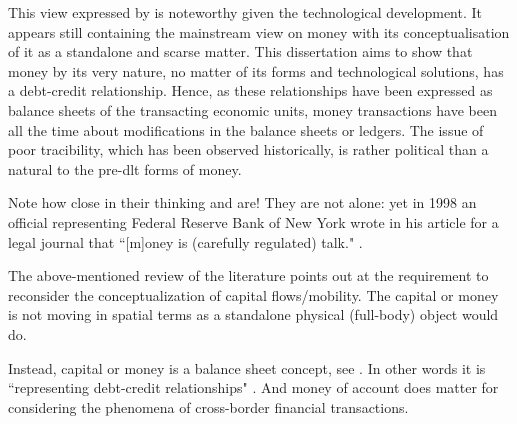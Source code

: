 This view expressed by \citeauthor{westermeier2023} is noteworthy given the technological development. It appears still containing the mainstream view on money with its conceptualisation of it as a standalone and scarse matter. This dissertation aims to show that money by its very nature, no matter of its forms and technological solutions, has a debt-credit relationship. Hence, as these relationships have been expressed as balance sheets of the transacting economic units, money transactions have been all the time about modifications in the balance sheets or ledgers. The issue of poor tracibility, which has been observed historically, is rather political than a natural to the pre-\ac{dlt} forms of money. 

Note how close in their thinking \cite{westermeier2023} and \cite{scott2022} are! They are not alone: yet in 1998 an official representing Federal Reserve Bank of New York wrote in his article for a legal journal that ``[m]oney is (carefully regulated) talk." \citep[p.~7]{sommer1998}.

The above-mentioned review of the literature points out at the requirement to reconsider the conceptualization of capital flows/mobility. The capital or money is not moving in spatial terms as a standalone physical (full-body) object would do.

Instead, capital or money is a balance sheet concept, see \citep{bell2001}. In other words it is ``representing debt-credit relationships" \citep[p.~17]{kregel1996}. And money of account does matter for considering the phenomena of cross-border financial transactions.

